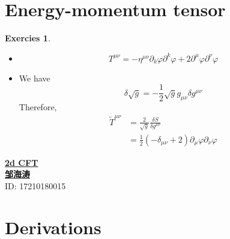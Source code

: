 \documentclass[11pt,a4paper]{article}
\theoremstyle{definition}
\newtheorem{exer}{Exercies}[subsection]
\begin{document}
\section{Energy-momentum tensor}
\begin{exer}
	\begin{itemize}
		\item \[
		T^{\mu \nu} = -\eta^{\mu \nu}\partial_{k}\varphi \partial^{k}\varphi + 2 \partial^{\mu}\varphi \partial^{\nu}\varphi
		\]
		\item We have
		\[
			\delta \sqrt{g}= -\frac{1}{2}\sqrt{g} g_{\mu\nu} \delta g^{\mu\nu}
		\]
		Therefore,
		\[
		\begin{aligned}
		\tilde{T}^{\mu\nu} &=\frac{2}{\sqrt{g}}\frac{\delta S}{\delta g^{\mu\nu}}\\
		&=\frac{1}{2} (-\delta_{\mu\nu}+2) \partial_{\mu} \varphi \partial_{\nu}\varphi
		\end{aligned}
		\]
	\end{itemize}
\end{exer}
\newpage
\noindent
{\LARGE\underline{\textbf{2d CFT}}}\\
{\hfill\large  \underline{\textbf{邹海涛}} \\
	\hfill ID: 17210180015}\\
\section{Derivations}
\end{document}
